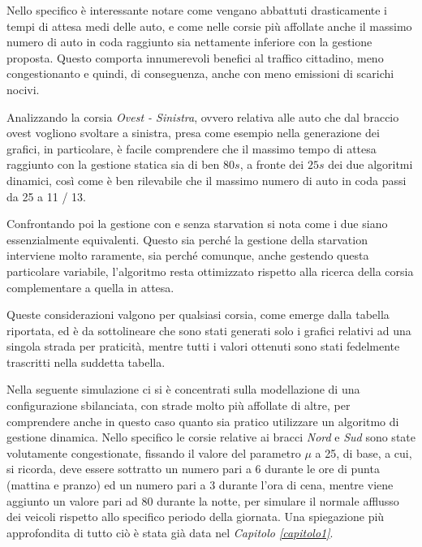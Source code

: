 Nello specifico è interessante notare come vengano abbattuti drasticamente i tempi di attesa medi delle auto, e come nelle corsie più affollate anche il massimo numero di auto in coda raggiunto sia nettamente inferiore con la gestione proposta. Questo comporta innumerevoli benefici al traffico cittadino, meno congestionanto e quindi, di conseguenza, anche con meno emissioni di scarichi nocivi. 

Analizzando la corsia \textit{Ovest - Sinistra}, ovvero relativa alle auto che dal braccio ovest vogliono svoltare a sinistra, presa come esempio nella generazione dei grafici, in particolare, è facile comprendere che il massimo tempo di attesa raggiunto con la gestione statica sia di ben $80s$, a fronte dei $25s$ dei due algoritmi dinamici, così come è ben rilevabile che il massimo numero di auto in coda passi da 25 a 11 / 13.

Confrontando poi la gestione con e senza starvation si nota come i due siano essenzialmente equivalenti. Questo sia perché la gestione della starvation interviene molto raramente, sia perché comunque, anche gestendo questa particolare variabile, l'algoritmo resta ottimizzato rispetto alla ricerca della corsia complementare a quella in attesa.

Queste considerazioni valgono per qualsiasi corsia, come emerge dalla tabella riportata, ed è da sottolineare che sono stati generati solo i grafici relativi ad una singola strada per praticità, mentre tutti i valori ottenuti sono stati fedelmente trascritti nella suddetta tabella.
\newline

Nella seguente simulazione ci si è concentrati sulla modellazione di una configurazione sbilanciata, con strade molto più affollate di altre, per comprendere anche in questo caso quanto sia pratico utilizzare un algoritmo di gestione dinamica. Nello specifico le corsie relative ai bracci \textit{Nord} e \textit{Sud} sono state volutamente congestionate, fissando il valore del parametro $\mu$ a 25, di base, a cui, si ricorda, deve essere sottratto un numero pari a 6 durante le ore di punta (mattina e pranzo) ed un numero pari a 3 durante l'ora di cena, mentre viene aggiunto un valore pari ad 80 durante la notte, per simulare il normale afflusso dei veicoli rispetto allo specifico periodo della giornata. Una spiegazione più approfondita di tutto ciò è stata già data nel \textit{Capitolo \ref{capitolo1}}.




